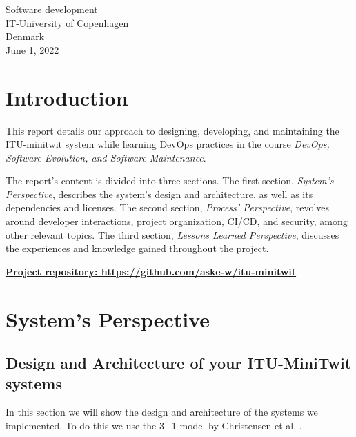 \documentclass{article}
\begin{document}
\begin{titlepage}
\begin{center}
            
        
            
        
            
        \Large
        Software development\\
        IT-University of Copenhagen\\
        Denmark\\
        June 1, 2022
            
    \end{center}
\end{titlepage}


\newpage
\thispagestyle{empty}
\tableofcontents
\thispagestyle{empty}
\newpage
\setcounter{page}{1}
\section{Introduction}
This report details our approach to designing, developing, and maintaining the ITU-minitwit system while learning DevOps practices in the course \textit{DevOps, Software Evolution, and Software Maintenance}.

The report's content is divided into three sections. The first section, \textit{System's Perspective}, describes the system's design and architecture, as well as its dependencies and licenses. The second section, \textit{Process' Perspective}, revolves around developer interactions, project organization, CI/CD, and security, among other relevant topics. The third section, \textit{Lessons Learned Perspective}, discusses the experiences and knowledge gained throughout the project. 

\bigskip
\noindent 
\href{https://github.com/aske-w/itu-minitwit}{\textbf{Project repository: https://github.com/aske-w/itu-minitwit}}

\section{System's Perspective}




\subsection{ Design and Architecture of your ITU-MiniTwit systems}
In this section we will show the design and architecture of the systems we implemented. To do this we use the 3+1 model by Christensen et al. \cite{christensen2004approach}.
\end{document}
